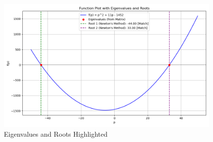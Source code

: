 \documentclass[journal]{IEEEtran}
\begin{document}
\begin{figure}[h!]
    \centering
    \includegraphics[width=\columnwidth]{figs/e.png} %
    \caption{Eigenvalues and Roots Highlighted}
    \label{fig:eigenvalues_roots}
\end{figure}
\end{document}
